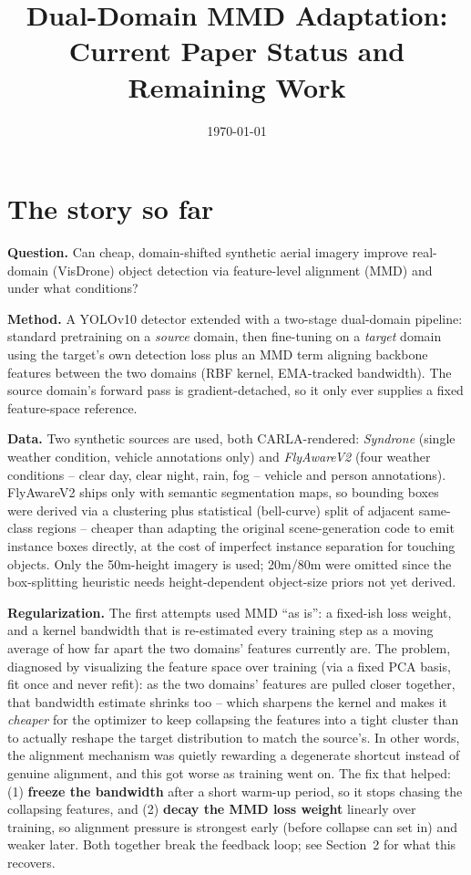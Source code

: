 \documentclass[11pt]{article}
\title{Dual-Domain MMD Adaptation: Current Paper Status and Remaining Work}
\author{}
\date{\today}
\begin{document}
\maketitle

\section{The story so far}

\textbf{Question.} Can cheap, domain-shifted synthetic aerial imagery improve real-domain
(VisDrone) object detection via feature-level alignment (MMD) and under what conditions?

\textbf{Method.} A YOLOv10 detector extended with a two-stage dual-domain pipeline: standard
pretraining on a \emph{source} domain, then fine-tuning on a \emph{target} domain using the
target's own detection loss plus an MMD term aligning backbone features between the two
domains (RBF kernel, EMA-tracked bandwidth). The source domain's forward pass is
gradient-detached, so it only ever supplies a fixed feature-space reference.

\textbf{Data.} Two synthetic sources are used, both CARLA-rendered: \emph{Syndrone} (single
weather condition, vehicle annotations only) and \emph{FlyAwareV2} (four weather conditions --
clear day, clear night, rain, fog -- vehicle and person annotations). FlyAwareV2 ships only
with semantic segmentation maps, so bounding boxes were derived via a clustering plus
statistical (bell-curve) split of adjacent same-class regions -- cheaper than adapting the
original scene-generation code to emit instance boxes directly, at the cost of imperfect
instance separation for touching objects. Only the 50m-height imagery is used; 20m/80m were
omitted since the box-splitting heuristic needs height-dependent object-size priors not yet
derived.

\textbf{Regularization.} The first attempts used MMD ``as is'': a fixed-ish loss weight, and a
kernel bandwidth that is re-estimated every training step as a moving average of how far apart
the two domains' features currently are. The problem, diagnosed by visualizing the feature
space over training (via a fixed PCA basis, fit once and never refit): as the two domains'
features are pulled closer together, that bandwidth estimate shrinks too -- which sharpens the
kernel and makes it \emph{cheaper} for the optimizer to keep collapsing the features into a
tight cluster than to actually reshape the target distribution to match the source's. In other
words, the alignment mechanism was quietly rewarding a degenerate shortcut instead of genuine
alignment, and this got worse as training went on. The fix that helped: (1) \textbf{freeze the
bandwidth} after a short warm-up period, so it stops chasing the collapsing features, and (2)
\textbf{decay the MMD loss weight} linearly over training, so alignment pressure is strongest
early (before collapse can set in) and weaker later. Both together break the feedback loop; see
Section~2 for what this recovers.
\end{document}
